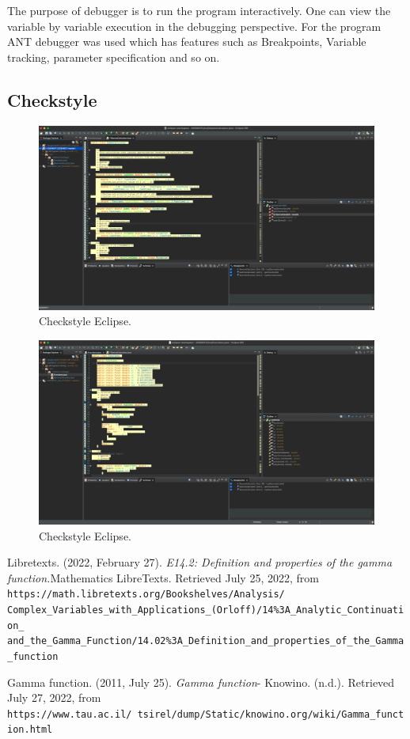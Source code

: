 \documentclass[12pt]{report}
\begin{document}
The purpose of debugger is to run the program interactively. One can view the variable by variable execution in the debugging perspective. For the program ANT debugger was used which has features such as Breakpoints, Variable tracking, parameter specification and so on.

\newpage
\subsection{Checkstyle}

\begin{figure}[h!]
    \begin{center}
    \includegraphics[width=0.7\linewidth]{Checkstyle1.png}
    \end{center}
    \caption{Checkstyle Eclipse.}
 \end{figure}
 
 \begin{figure}[h!]
    \begin{center}
    \includegraphics[width=0.7\linewidth]{Checkstyle2.png}
    \end{center}
    \caption{Checkstyle Eclipse.}
 \end{figure}


\begin{thebibliography}{9}
Libretexts. (2022, February 27). \textit{E14.2: Definition and properties of the gamma function.}Mathematics LibreTexts. Retrieved July 25, 2022, from \texttt{https://math.libretexts.org/Bookshelves/Analysis/\\Complex\_Variables\_with\_Applications\_(Orloff)/14\%3A\_Analytic\_Continuation\_\\and\_the\_Gamma\_Function/14.02\%3A\_Definition\_and\_properties\_of\_the\_Gamma\_function}

Gamma function. (2011, July 25). \textit{Gamma function}- Knowino. (n.d.). Retrieved July 27, 2022, from\\ \texttt{https://www.tau.ac.il/~tsirel/dump/Static/knowino.org/wiki/Gamma\_function.html}

\end{thebibliography}
\end{document}
